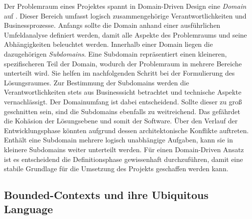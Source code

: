 Der Problemraum eines Projektes spannt in Domain-Driven Design eine \emph{Domain} auf \cite[S. 56]{Vernon.2015}. Dieser Bereich umfasst logisch zusammengehörige Verantwortlichkeiten und Businessprozesse. Anfangs sollte die Domain anhand einer ausführlichen Umfeldanalyse definiert werden, damit alle Aspekte des Problemraums und seine Abhängigkeiten beleuchtet werden. Innerhalb einer Domain liegen die dazugehörigen \emph{Subdomains}. Eine Subdomain repräsentiert einen kleineren, spezifischeren Teil der Domain, wodurch der Problemraum in mehrere Bereiche unterteilt wird. Sie helfen im nachfolgenden Schritt bei der Formulierung des Lösungsraumes. Zur Bestimmung der Subdomains werden die Verantwortlichkeiten stets aus Businesssicht betrachtet und technische Aspekte vernachlässigt. Der Domainumfang ist dabei entscheidend. Sollte dieser zu groß geschnitten sein, sind die Subdomains ebenfalls zu weitreichend. Das gefährdet die Kohäsion der Lösungsebene und somit der Software. Über den Verlauf der Entwicklungsphase könnten aufgrund dessen architektonische Konflikte auftreten. Enthält eine Subdomain mehrere logisch unabhängige Aufgaben, kann sie in kleinere Subdomains weiter unterteilt werden. Für einen Domain-Driven Ansatz ist es entscheidend die Definitionsphase gewissenhaft durchzuführen, damit eine stabile Grundlage für die Umsetzung des Projekts geschaffen werden kann. 

\pagebreak

\subsection{Bounded-Contexts und ihre Ubiquitous Language}

